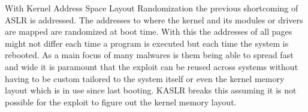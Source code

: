 With Kernel Address Space Layout Randomization the previous shortcoming of ASLR is addressed.
The addresses to where the kernel and its modules or drivers are mapped are randomized at boot time.
With this the addresses of all pages might not differ each time a program is executed but each time the system is rebooted.
As a main focus of many malwares is them being able to spread fast and wide it is paramount that the exploit can be reused across systems without having to be custom tailored to the system itself or even the kernel memory layout which is in use since last booting.
KASLR breaks this assuming it is not possible for the exploit to figure out the kernel memory layout.
